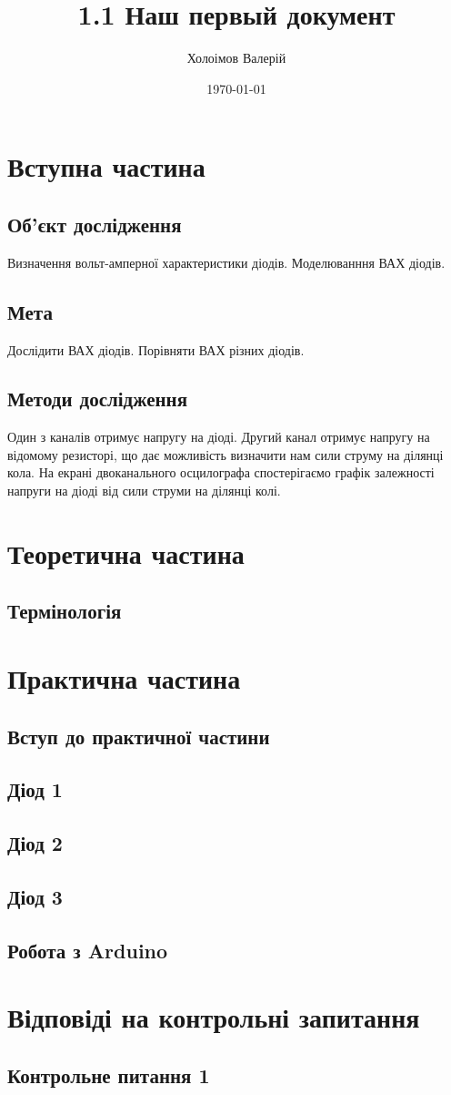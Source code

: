 \documentclass[a4paper,12pt]{article}
\author{Холоімов Валерій}
\title{1.1 Наш первый документ}
\date{\today}
\begin{document}




\tableofcontents

\newpage

\section{Вступна частина}
\subsection{Об'єкт дослідження}
Визначення вольт-амперної характеристики діодів. Моделюванння ВАХ діодів.
\subsection{Мета}
Дослідити ВАХ діодів. Порівняти ВАХ різних діодів.
\subsection{Методи дослідження}
Один з каналів отримує напругу на діоді. Другий канал отримує напругу на відомому резисторі, що дає можливість визначити нам сили струму на ділянці кола. На екрані двоканального осцилографа спостерігаємо графік залежності напруги на діоді від сили струми на ділянці колі.

\section{Теоретична частина}
\subsection{Термінологія}

\newpage


\section{Практична частина}
\subsection{Вступ до практичної частини}

\newpage
\subsection{Діод 1}

\newpage
\subsection{Діод 2}

\newpage
\subsection{Діод 3}

\newpage
\subsection{Робота з Arduino}







\section{Відповіді на контрольні запитання}
\subsection{Контрольне питання 1}
\end{document}
